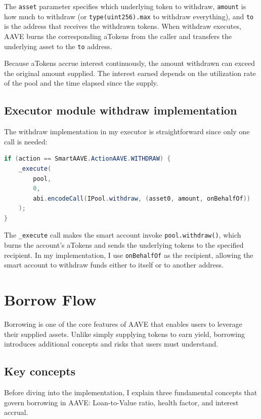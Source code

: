 The \texttt{asset} parameter specifies which underlying token to withdraw, \texttt{amount} is how much to withdraw (or \texttt{type(uint256).max} to withdraw everything), and \texttt{to} is the address that receives the withdrawn tokens. When withdraw executes, AAVE burns the corresponding aTokens from the caller and transfers the underlying asset to the \texttt{to} address.

Because aTokens accrue interest continuously, the amount withdrawn can exceed the original amount supplied. The interest earned depends on the utilization rate of the pool and the time elapsed since the supply.

\subsection{Executor module withdraw implementation}

The withdraw implementation in my executor is straightforward since only one call is needed:

\begin{lstlisting}[language=Java,caption={Withdraw implementation in the executor},label=lst:executor-withdraw]
if (action == SmartAAVE.ActionAAVE.WITHDRAW) {
    _execute(
        pool,
        0,
        abi.encodeCall(IPool.withdraw, (asset0, amount, onBehalfOf))
    );
}
\end{lstlisting}

The \texttt{\_execute} call makes the smart account invoke \texttt{pool.withdraw()}, which burns the account's aTokens and sends the underlying tokens to the specified recipient. In my implementation, I use \texttt{onBehalfOf} as the recipient, allowing the smart account to withdraw funds either to itself or to another address.

\section{Borrow Flow}

Borrowing is one of the core features of AAVE that enables users to leverage their supplied assets. Unlike simply supplying tokens to earn yield, borrowing introduces additional concepts and risks that users must understand.

\subsection{Key concepts}

Before diving into the implementation, I explain three fundamental concepts that govern borrowing in AAVE: Loan-to-Value ratio, health factor, and interest accrual.

